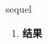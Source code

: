
\begin{frame}
{\huge sequel}
\begin{center}
\begin{enumerate}\Large
  \item \textbf{结果}
\end{enumerate}
\end{center}
\end{frame}
